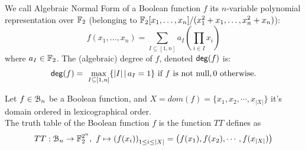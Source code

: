 \documentclass[11pt]{llncs}
\begin{document}
\begin{definition}\label{def:anf}
We call Algebraic Normal Form of a Boolean function $f$ its $n$-variable polynomial representation over $\mathbb{F}_2$ (\ie belonging to $\mathbb{F}_2[x_1,\dots,x_n]/(x_1^2+x_1,\dots,x_n^2+x_n)$):
	\[f(x_1,\dots,x_n)= \sum_{I \subseteq [1,n]} a_I \left( \prod_{i \in I} x_i \right) \]%
	where $a_I\in \mathbb{F}_2$. 
The (algebraic) degree of $f$, denoted $\mathsf{deg}(f)$ is: \[\mathsf{deg}(f)=\
\max_{I\subseteq [1,n]}\{ |I|\, | \, a_I=1\}  \text{ if $f$ is not null},0  \text{ otherwise}.\]
\end{definition}	

\begin{definition}\label{def:trutthTable}
	Let $f\in \mathcal{B}_{n}$ be a Boolean function, and $X = dom(f) = \{x_1, x_2, \cdots, x_{|X|}\}$ it's domain ordered in lexicographical order.\\
	The truth table of the Boolean function $f$ is the function $TT$ defines as
	\begin{align*}
	TT: \mathcal{B}_{n} \rightarrow \mathbb{F}_2^{2^n},\  f \mapsto \left(f(x_i)\right)_{1\leq i \leq |X|} = \left(f(x_1), f(x_2), \cdots, f(x_{|X|})\right)
	\end{align*}
\end{definition}


\end{document}
